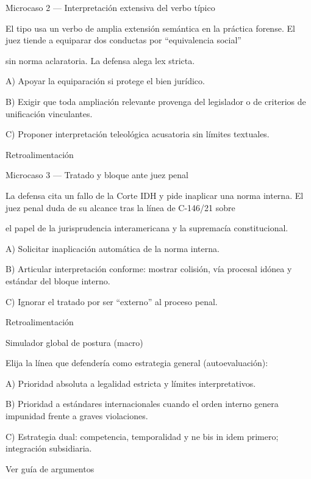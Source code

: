 \documentclass[11pt,a4paper]{article}
\begin{document}
      Microcaso 2 — Interpretación extensiva del verbo típico\par


        El tipo usa un verbo de amplia extensión semántica en la práctica forense. El juez tiende a equiparar dos conductas por “equivalencia social”\par
        sin norma aclaratoria. La defensa alega lex stricta.\par


       A) Apoyar la equiparación si protege el bien jurídico.\par
       B) Exigir que toda ampliación relevante provenga del legislador o de criterios de unificación vinculantes.\par
       C) Proponer interpretación teleológica acusatoria sin límites textuales.\par
      Retroalimentación\par





      Microcaso 3 — Tratado y bloque ante juez penal\par


        La defensa cita un fallo de la Corte IDH y pide inaplicar una norma interna. El juez penal duda de su alcance tras la línea de C-146/21 sobre\par
        el papel de la jurisprudencia interamericana y la supremacía constitucional.\par


       A) Solicitar inaplicación automática de la norma interna.\par
       B) Articular interpretación conforme: mostrar colisión, vía procesal idónea y estándar del bloque interno.\par
       C) Ignorar el tratado por ser “externo” al proceso penal.\par
      Retroalimentación\par





      Simulador global de postura (macro)\par

      Elija la línea que defendería como estrategia general (autoevaluación):\par

       A) Prioridad absoluta a legalidad estricta y límites interpretativos.\par
       B) Prioridad a estándares internacionales cuando el orden interno genera impunidad frente a graves violaciones.\par
       C) Estrategia dual: competencia, temporalidad y ne bis in idem primero; integración subsidiaria.\par
      Ver guía de argumentos\par
\end{document}
